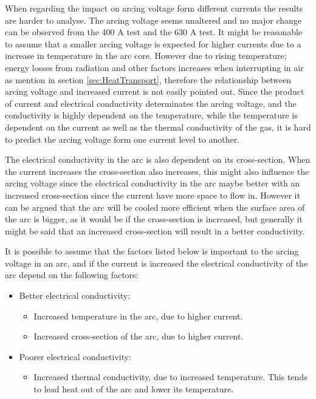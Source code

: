 \documentclass[10pt,a4paper]{article}
\begin{document}
When regarding the impact on arcing voltage form different currents the results are harder to analyse. The arcing voltage seems unaltered and no major change can be observed from the 400 A test and the 630 A test. It might be reasonable to assume that a smaller arcing voltage is expected for higher currents due to a increase in temperature in the arc core. However due to rising temperature; energy losses from radiation and other factors increases when interrupting in air as mention in section \ref{sec:HeatTransport}, therefore the relationship between arcing voltage and increased current is not easily pointed out. Since the product of current and electrical conductivity determinates the arcing voltage, and the conductivity is highly dependent on the temperature, while the temperature is dependent on the current as well as the thermal conductivity of the gas, it is hard to predict the arcing voltage form one current level to another.

The electrical conductivity in the arc is also dependent on its cross-section. When the current increases the cross-section also increases, this might also influence the arcing voltage since the electrical conductivity in the arc maybe better with an increased cross-section since the current have more space to flow in. However it can be argued that the arc will be cooled more efficient when the surface area of the arc is bigger, as it would be if the cross-section is increased, but generally it might be said that an increased cross-section will result in a better conductivity.

It is possible to assume that the factors listed below is important to the arcing voltage in an arc, and if the current is increased the electrical conductivity of the arc depend on the following factors: 
\begin{itemize}
\item[] Better electrical conductivity:
	\begin{itemize}
		\item Increased temperature in the arc, due to higher current.
		\item Increased cross-section of the arc, due to higher current.
	\end{itemize}
\item[] Poorer electrical conductivity:
	\begin{itemize}
		\item Increased thermal conductivity, due to increased temperature. This tends to lead heat out of the arc and lower its temperature.
	\end{itemize}		 
\end{itemize} 
\end{document}
